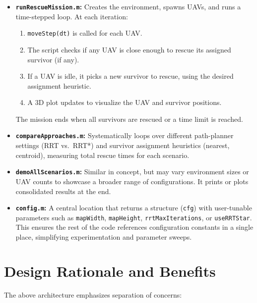 \documentclass[12pt,a4paper]{report}
\begin{document}
\begin{itemize}
    \item \textbf{\texttt{runRescueMission.m}:}
          Creates the environment, spawns UAVs, and runs a time-stepped loop. 
          At each iteration:
          \begin{enumerate}
              \item \texttt{moveStep(dt)} is called for each UAV.
              \item The script checks if any UAV is close enough to rescue its assigned
                    survivor (if any).
              \item If a UAV is idle, it picks a new survivor to rescue, using the
                    desired assignment heuristic.
              \item A 3D plot updates to visualize the UAV and survivor positions.
          \end{enumerate}
          The mission ends when all survivors are rescued or a time limit is reached.

    \item \textbf{\texttt{compareApproaches.m}:}
          Systematically loops over different path-planner settings (RRT vs.\ RRT*)
          and survivor assignment heuristics (nearest, centroid), measuring total rescue
          times for each scenario.

    \item \textbf{\texttt{demoAllScenarios.m}:}
          Similar in concept, but may vary environment sizes or UAV counts to showcase
          a broader range of configurations. It prints or plots consolidated results
          at the end.

    \item \textbf{\texttt{config.m}:}
          A central location that returns a structure (\texttt{cfg}) with user-tunable
          parameters such as \texttt{mapWidth}, \texttt{mapHeight}, \texttt{rrtMaxIterations},
          or \texttt{useRRTStar}. This ensures the rest of the code references
          configuration constants in a single place, simplifying experimentation and
          parameter sweeps.
\end{itemize}

\section{Design Rationale and Benefits}
\label{sec:design_rationale}
The above architecture emphasizes separation of concerns:
\end{document}

